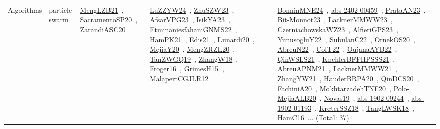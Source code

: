 {\begin{longtable}{lp{3cm}>{\raggedright\arraybackslash}p{6cm}>{\raggedright\arraybackslash}p{6cm}>{\raggedright\arraybackslash}p{8cm}}
Algorithms & particle swarm & \href{../works/MengLZB21.pdf}{MengLZB21}~\cite{MengLZB21}, \href{../works/SacramentoSP20.pdf}{SacramentoSP20}~\cite{SacramentoSP20}, \href{../works/ZarandiASC20.pdf}{ZarandiASC20}~\cite{ZarandiASC20} & \href{../works/LuZZYW24.pdf}{LuZZYW24}~\cite{LuZZYW24}, \href{../works/ZhuSZW23.pdf}{ZhuSZW23}~\cite{ZhuSZW23}, \href{../works/AfsarVPG23.pdf}{AfsarVPG23}~\cite{AfsarVPG23}, \href{../works/IsikYA23.pdf}{IsikYA23}~\cite{IsikYA23}, \href{../works/EtminaniesfahaniGNMS22.pdf}{EtminaniesfahaniGNMS22}~\cite{EtminaniesfahaniGNMS22}, \href{../works/HamPK21.pdf}{HamPK21}~\cite{HamPK21}, \href{../works/Edis21.pdf}{Edis21}~\cite{Edis21}, \href{../works/Lunardi20.pdf}{Lunardi20}~\cite{Lunardi20}, \href{../works/MejiaY20.pdf}{MejiaY20}~\cite{MejiaY20}, \href{../works/MengZRZL20.pdf}{MengZRZL20}~\cite{MengZRZL20}, \href{../works/TanZWGQ19.pdf}{TanZWGQ19}~\cite{TanZWGQ19}, \href{../works/ZhangW18.pdf}{ZhangW18}~\cite{ZhangW18}, \href{../works/Froger16.pdf}{Froger16}~\cite{Froger16}, \href{../works/GrimesH15.pdf}{GrimesH15}~\cite{GrimesH15}, \href{../works/MalapertCGJLR12.pdf}{MalapertCGJLR12}~\cite{MalapertCGJLR12} & \href{../works/BonninMNE24.pdf}{BonninMNE24}~\cite{BonninMNE24}, \href{../works/abs-2402-00459.pdf}{abs-2402-00459}~\cite{abs-2402-00459}, \href{../works/PrataAN23.pdf}{PrataAN23}~\cite{PrataAN23}, \href{../works/Bit-Monnot23.pdf}{Bit-Monnot23}~\cite{Bit-Monnot23}, \href{../works/LacknerMMWW23.pdf}{LacknerMMWW23}~\cite{LacknerMMWW23}, \href{../works/CzerniachowskaWZ23.pdf}{CzerniachowskaWZ23}~\cite{CzerniachowskaWZ23}, \href{../works/AlfieriGPS23.pdf}{AlfieriGPS23}~\cite{AlfieriGPS23}, \href{../works/YunusogluY22.pdf}{YunusogluY22}~\cite{YunusogluY22}, \href{../works/SubulanC22.pdf}{SubulanC22}~\cite{SubulanC22}, \href{../works/OrnekOS20.pdf}{OrnekOS20}~\cite{OrnekOS20}, \href{../works/AbreuN22.pdf}{AbreuN22}~\cite{AbreuN22}, \href{../works/ColT22.pdf}{ColT22}~\cite{ColT22}, \href{../works/OujanaAYB22.pdf}{OujanaAYB22}~\cite{OujanaAYB22}, \href{../works/QinWSLS21.pdf}{QinWSLS21}~\cite{QinWSLS21}, \href{../works/KoehlerBFFHPSSS21.pdf}{KoehlerBFFHPSSS21}~\cite{KoehlerBFFHPSSS21}, \href{../works/AbreuAPNM21.pdf}{AbreuAPNM21}~\cite{AbreuAPNM21}, \href{../works/LacknerMMWW21.pdf}{LacknerMMWW21}~\cite{LacknerMMWW21}, \href{../works/ZhangYW21.pdf}{ZhangYW21}~\cite{ZhangYW21}, \href{../works/HauderBRPA20.pdf}{HauderBRPA20}~\cite{HauderBRPA20}, \href{../works/QinDCS20.pdf}{QinDCS20}~\cite{QinDCS20}, \href{../works/FachiniA20.pdf}{FachiniA20}~\cite{FachiniA20}, \href{../works/MokhtarzadehTNF20.pdf}{MokhtarzadehTNF20}~\cite{MokhtarzadehTNF20}, \href{../works/Polo-MejiaALB20.pdf}{Polo-MejiaALB20}~\cite{Polo-MejiaALB20}, \href{../works/Novas19.pdf}{Novas19}~\cite{Novas19}, \href{../works/abs-1902-09244.pdf}{abs-1902-09244}~\cite{abs-1902-09244}, \href{../works/abs-1902-01193.pdf}{abs-1902-01193}~\cite{abs-1902-01193}, \href{../works/KreterSSZ18.pdf}{KreterSSZ18}~\cite{KreterSSZ18}, \href{../works/TangLWSK18.pdf}{TangLWSK18}~\cite{TangLWSK18}, \href{../works/HamC16.pdf}{HamC16}~\cite{HamC16}... (Total: 37)\\

\end{longtable}}
